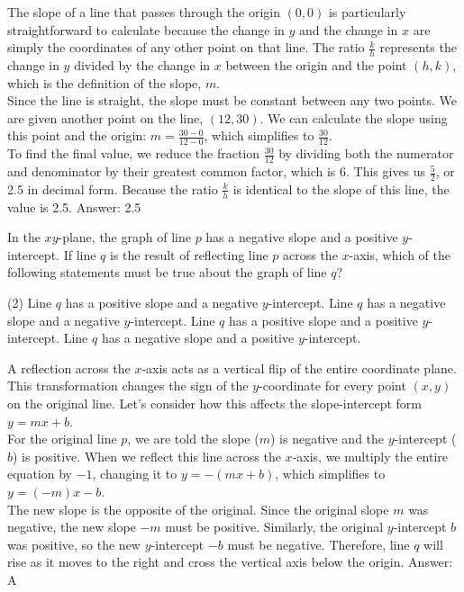 \documentclass[11pt,paper=a4,answers]{exam}
\begin{document}
\begin{questions}
\begin{solution}
The slope of a line that passes through the origin $(0, 0)$ is particularly straightforward to calculate because the change in $y$ and the change in $x$ are simply the coordinates of any other point on that line. The ratio $\frac{k}{h}$ represents the change in $y$ divided by the change in $x$ between the origin and the point $(h, k)$, which is the definition of the slope, $m$.
\\[10pt]
Since the line is straight, the slope must be constant between any two points. We are given another point on the line, $(12, 30)$. We can calculate the slope using this point and the origin: $m = \frac{30 - 0}{12 - 0}$, which simplifies to $\frac{30}{12}$. 
\\[10pt]
To find the final value, we reduce the fraction $\frac{30}{12}$ by dividing both the numerator and denominator by their greatest common factor, which is 6. This gives us $\frac{5}{2}$, or 2.5 in decimal form. Because the ratio $\frac{k}{h}$ is identical to the slope of this line, the value is 2.5.
\vspace{15pt}
Answer: \colorbox{yellow!100}{2.5}
\end{solution}

\question
In the $xy$-plane, the graph of line $p$ has a negative slope and a positive $y$-intercept. If line $q$ is the result of reflecting line $p$ across the $x$-axis, which of the following statements must be true about the graph of line $q$?
\begin{tasks}(2)
    \task Line $q$ has a positive slope and a negative $y$-intercept.
    \task Line $q$ has a negative slope and a negative $y$-intercept.
    \task Line $q$ has a positive slope and a positive $y$-intercept.
    \task Line $q$ has a negative slope and a positive $y$-intercept.
\end{tasks}

\begin{solution}
A reflection across the $x$-axis acts as a vertical flip of the entire coordinate plane. This transformation changes the sign of the $y$-coordinate for every point $(x, y)$ on the original line. Let's consider how this affects the slope-intercept form $y = mx + b$.
\\[10pt]
For the original line $p$, we are told the slope ($m$) is negative and the $y$-intercept ($b$) is positive. When we reflect this line across the $x$-axis, we multiply the entire equation by $-1$, changing it to $y = -(mx + b)$, which simplifies to $y = (-m)x - b$.
\\[10pt]
The new slope is the opposite of the original. Since the original slope $m$ was negative, the new slope $-m$ must be positive. Similarly, the original $y$-intercept $b$ was positive, so the new $y$-intercept $-b$ must be negative. Therefore, line $q$ will rise as it moves to the right and cross the vertical axis below the origin.
\vspace{15pt}
Answer: \colorbox{yellow!100}{A}
\end{solution}


\end{questions}
\end{document}
